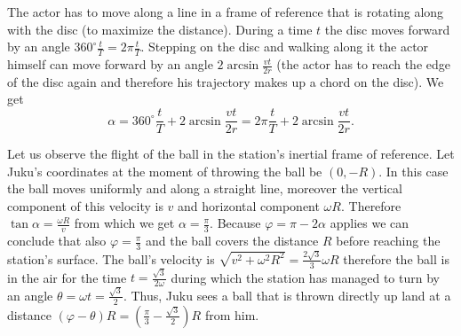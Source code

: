 \documentclass[11pt]{article}
\begin{document}

\solueng
The actor has to move along a line in a frame of reference that is rotating along with the disc (to maximize the distance). During a time $t$ the disc moves forward by an angle $360^\circ\frac{t}{T}=2\pi\frac{t}{T}$. Stepping on the disc and walking along it the actor himself can move forward by an angle $2\arcsin\frac{vt}{2r}$ (the actor has to reach the edge of the disc again and therefore his trajectory makes up a chord on the disc). We get
$$\alpha=360^\circ\frac{t}{T}+2\arcsin\frac{vt}{2r}=2\pi\frac{t}{T}+2\arcsin\frac{vt}{2r}.$$
\probend
\bigskip


\solueng
Let us observe the flight of the ball in the station’s inertial frame of reference. Let Juku’s coordinates at the moment of throwing the ball be $(0,-R)$. In this case the ball moves uniformly and along a straight line, moreover the vertical component of this velocity is $v$ and horizontal component $\omega R$. Therefore $\tan\alpha=\frac{\omega R}{v}$ from which we get $\alpha=\frac{\pi}{3}$. Because $\varphi=\pi-2\alpha$ applies we can conclude that also $\varphi=\frac{\pi}{3}$ and the ball covers the distance $R$ before reaching the station’s surface. The ball’s velocity is $\sqrt{v^2+\omega^2R^2}=\frac{2\sqrt{3}}{3}\omega R$ therefore the ball is in the air for the time $t=\frac{\sqrt{3}}{2\omega}$ during which the station has managed to turn by an angle $\theta=\omega t=\frac{\sqrt{3}}{2}$. Thus, Juku sees a ball that is thrown directly up land at a distance $\left(\varphi-\theta\right)R=\left(\frac{\pi}{3}-\frac{\sqrt{3}}{2}\right)R$ from him.
\begin{center}
\end{center}
\probend
\bigskip
\end{document}
